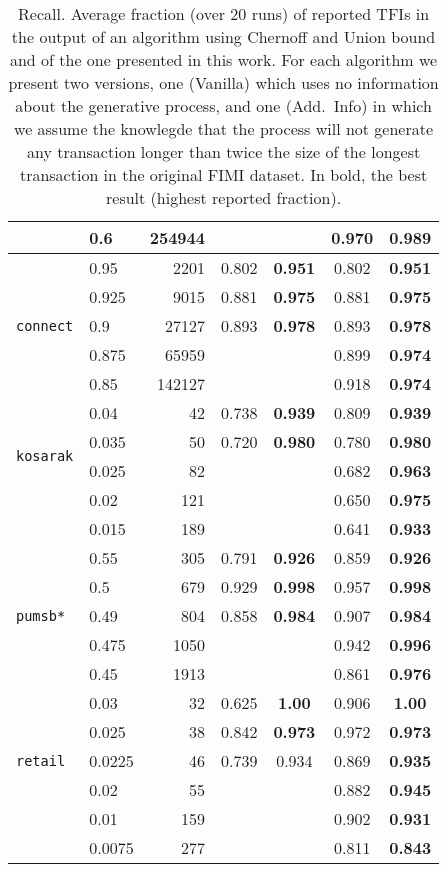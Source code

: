 \begin{table}[tbp]
\begin{tabular}{llrcccc}
 & 0.6 & 254944 & &  & 0.970& \bf 0.989\\
\midrule
\multirow{5}{*}{\texttt{connect}} & 0.95 & 2201 & 0.802& \bf 0.951&
0.802& \bf 0.951\\
 & 0.925 & 9015 & 0.881& \bf 0.975& 0.881& \bf 0.975 \\
 & 0.9 & 27127 & 0.893& \bf 0.978& 0.893& \bf 0.978\\
 & 0.875 & 65959 & &  & 0.899& \bf 0.974\\
 & 0.85 & 142127 & &  & 0.918& \bf 0.974\\
\midrule
\multirow{4}{*}{\texttt{kosarak}} & 0.04 & 42 & 0.738& \bf 0.939&
0.809& \bf 0.939\\
 & 0.035 & 50 & 0.720& \bf 0.980& 0.780& \bf 0.980\\
 & 0.025 & 82 & &  & 0.682& \bf0.963\\
 & 0.02 & 121 & &  & 0.650& \bf 0.975\\
 & 0.015 & 189 & &  & 0.641& \bf 0.933\\
\midrule
\multirow{5}{*}{\texttt{pumsb*}} & 0.55 & 305 & 0.791& \bf 0.926&
0.859& \bf 0.926\\
 & 0.5 & 679 & 0.929& \bf 0.998& 0.957& \bf 0.998\\
 & 0.49 & 804 & 0.858& \bf 0.984& 0.907& \bf 0.984\\
 & 0.475 & 1050 & &  & 0.942& \bf 0.996\\
 & 0.45 & 1913 & &  & 0.861& \bf 0.976\\
\midrule
\multirow{5}{*}{\texttt{retail}} & 0.03 & 32 & 0.625& \bf 1.00&
0.906& \bf 1.00\\
 & 0.025 & 38 & 0.842& \bf 0.973& 0.972& \bf 0.973\\
 & 0.0225 & 46 & 0.739& 0.934& 0.869& \bf 0.935\\
 & 0.02 & 55 & &  & 0.882& \bf 0.945\\
 & 0.01 & 159 & &  & 0.902& \bf 0.931\\
 & 0.0075 & 277 & &  & 0.811& \bf 0.843\\
 \bottomrule
 \end{tabular}
  \caption{Recall. Average fraction (over 20 runs) of reported TFIs
  in the output of an algorithm using Chernoff and Union bound and of the one
  presented in this work. For each algorithm we present two versions, one
  (Vanilla) which uses no information about the generative process, and one
  (Add.~Info) in which we assume the knowlegde that the process will not
  generate any transaction longer than twice the size of the longest transaction
  in the original FIMI dataset. In bold, the best result (highest reported
  fraction).}
\label{table:power}
\end{table}
